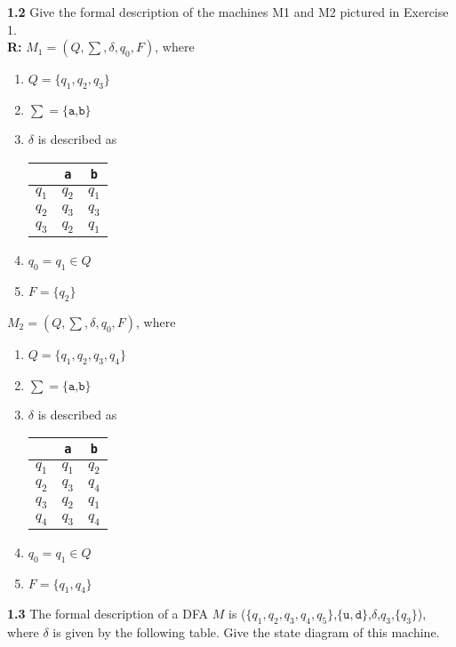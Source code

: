 \documentclass{article}
\begin{document}
\textbf{1.2} Give the formal description of the machines M1 and M2 pictured in
Exercise 1. \\
\textbf{R: } $M_1 = ( Q, \sum, \delta, q_0, F)$, where
\begin{enumerate}
    \item $Q = \{q_1, q_2, q_3\}$
    \item $\sum = \{\texttt{a,b}\}$
    \item $\delta$ is described as
    \begin{center}
        \begin{tabular}{c|cc}
            &   \texttt{a}     &   \texttt{b} \\
            \hline
            $q_1$   &   $q_2$   &   $q_1$   \\
            $q_2$   &   $q_3$   &   $q_3$   \\
            $q_3$   &   $q_2$   &   $q_1$
        \end{tabular}
    \end{center}
    \item $q_0 = q_1 \in Q$
    \item $F = \{q_2\}$
\end{enumerate}

$M_2 = ( Q, \sum, \delta, q_0, F)$, where
\begin{enumerate}
    \item $Q = \{q_1, q_2, q_3, q_4\}$
    \item $\sum = \{\texttt{a,b}\}$
    \item $\delta$ is described as
    \begin{center}
        \begin{tabular}{c|cc}
            &   \texttt{a}     &   \texttt{b} \\
            \hline
            $q_1$   &   $q_1$   &   $q_2$   \\
            $q_2$   &   $q_3$   &   $q_4$   \\
            $q_3$   &   $q_2$   &   $q_1$   \\
            $q_4$   &   $q_3$   &   $q_4$
        \end{tabular}
    \end{center}
    \item $q_0 = q_1 \in Q$
    \item $F = \{q_1, q_4\}$
\end{enumerate}


\textbf{1.3} The formal description of a DFA $M$ is
($\{q_1,q_2,q_3,q_4,q_5\}$,$\{\texttt{u},\texttt{d}\}$,$\delta$,$q_3$,$\{q_3\}$),
where $\delta$ is given by the following table. Give the state diagram of this
machine.
\end{document}
